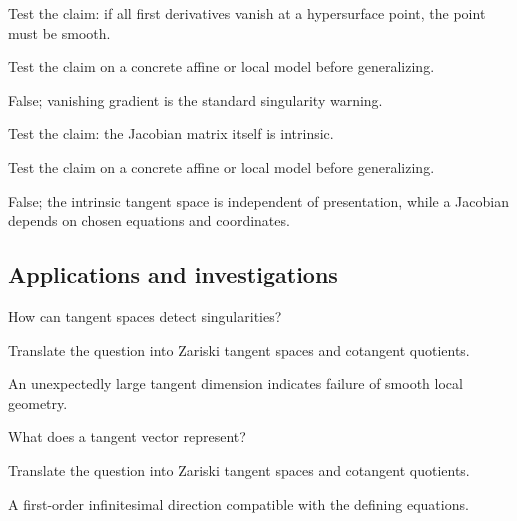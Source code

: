 \begin{exercise}\label{exr:vi32-expand-11}
Test the claim: if all first derivatives vanish at a hypersurface point, the point must be smooth.
\end{exercise}
\begin{hint}
Test the claim on a concrete affine or local model before generalizing.
\end{hint}
\begin{solution}
False; vanishing gradient is the standard singularity warning.
\end{solution}

\begin{exercise}\label{exr:vi32-expand-12}
Test the claim: the Jacobian matrix itself is intrinsic.
\end{exercise}
\begin{hint}
Test the claim on a concrete affine or local model before generalizing.
\end{hint}
\begin{solution}
False; the intrinsic tangent space is independent of presentation, while a Jacobian depends on chosen equations and coordinates.
\end{solution}

\subsection*{Applications and investigations}

\begin{exercise}\label{exr:vi32-expand-13}
How can tangent spaces detect singularities?
\end{exercise}
\begin{hint}
Translate the question into Zariski tangent spaces and cotangent quotients.
\end{hint}
\begin{solution}
An unexpectedly large tangent dimension indicates failure of smooth local geometry.
\end{solution}

\begin{exercise}\label{exr:vi32-expand-14}
What does a tangent vector represent?
\end{exercise}
\begin{hint}
Translate the question into Zariski tangent spaces and cotangent quotients.
\end{hint}
\begin{solution}
A first-order infinitesimal direction compatible with the defining equations.
\end{solution}

